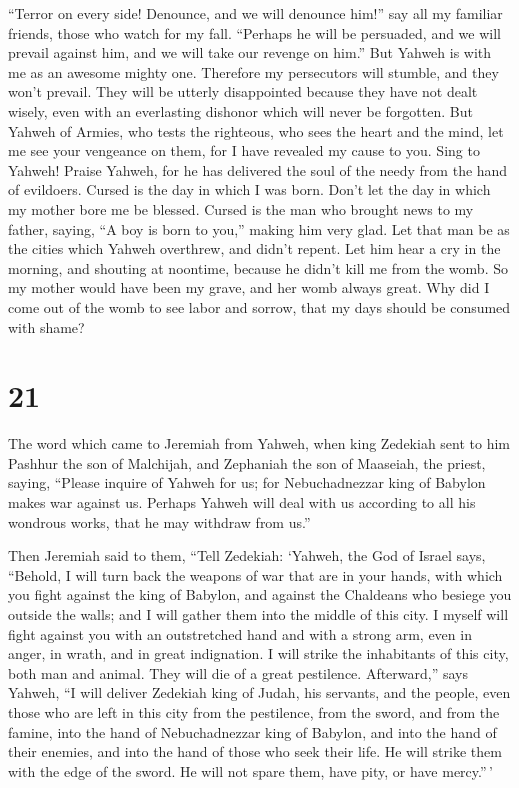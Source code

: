 ``Terror on every side! Denounce, and we will denounce him!'' say all my
familiar friends, those who watch for my fall. ``Perhaps he will be
persuaded, and we will prevail against him, and we will take our revenge
on him.''  But Yahweh is with me as an awesome mighty one.
Therefore my persecutors will stumble, and they won't prevail. They will
be utterly disappointed because they have not dealt wisely, even with an
everlasting dishonor which will never be forgotten.  But
Yahweh of Armies, who tests the righteous, who sees the heart and the
mind, let me see your vengeance on them, for I have revealed my cause to
you.  Sing to Yahweh! Praise Yahweh, for he has delivered
the soul of the needy from the hand of evildoers.  Cursed
is the day in which I was born. Don't let the day in which my mother
bore me be blessed.  Cursed is the man who brought news to
my father, saying, ``A boy is born to you,'' making him very glad.
 Let that man be as the cities which Yahweh overthrew, and
didn't repent. Let him hear a cry in the morning, and shouting at
noontime,  because he didn't kill me from the womb. So my
mother would have been my grave, and her womb always great.
 Why did I come out of the womb to see labor and sorrow,
that my days should be consumed with shame?

\hypertarget{section-20}{%
\section{21}\label{section-20}}

 The word which came to Jeremiah from Yahweh, when king
Zedekiah sent to him Pashhur the son of Malchijah, and Zephaniah the son
of Maaseiah, the priest, saying,  ``Please inquire of Yahweh
for us; for Nebuchadnezzar king of Babylon makes war against us. Perhaps
Yahweh will deal with us according to all his wondrous works, that he
may withdraw from us.''

 Then Jeremiah said to them, ``Tell Zedekiah: 
`Yahweh, the God of Israel says, ``Behold, I will turn back the weapons
of war that are in your hands, with which you fight against the king of
Babylon, and against the Chaldeans who besiege you outside the walls;
and I will gather them into the middle of this city.  I
myself will fight against you with an outstretched hand and with a
strong arm, even in anger, in wrath, and in great indignation.
 I will strike the inhabitants of this city, both man and
animal. They will die of a great pestilence.  Afterward,''
says Yahweh, ``I will deliver Zedekiah king of Judah, his servants, and
the people, even those who are left in this city from the pestilence,
from the sword, and from the famine, into the hand of Nebuchadnezzar
king of Babylon, and into the hand of their enemies, and into the hand
of those who seek their life. He will strike them with the edge of the
sword. He will not spare them, have pity, or have mercy.''\,'

